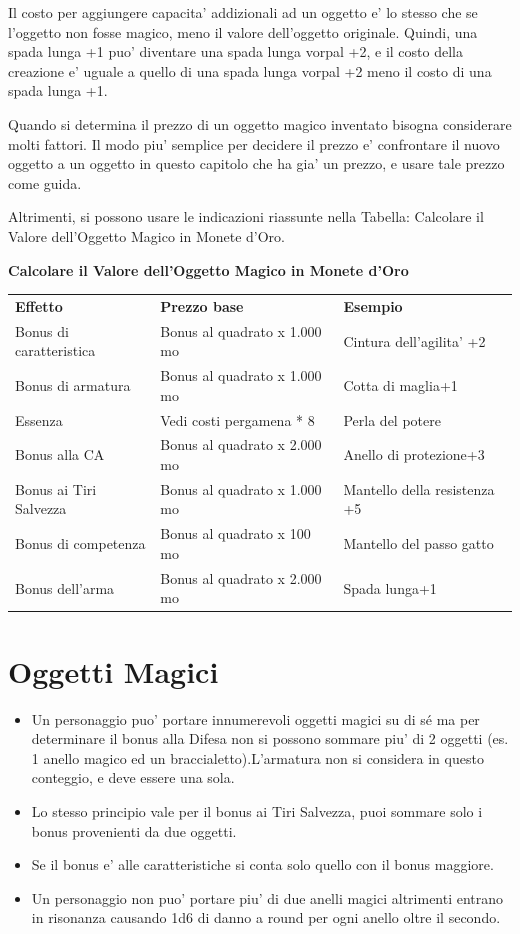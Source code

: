 \documentclass[a4paper,11pt,twoside,openany]{book}
\begin{document}
{		Il costo per aggiungere capacita' addizionali ad un oggetto e' lo stesso che se l'oggetto non fosse magico, meno il valore dell'oggetto originale. Quindi, una spada lunga +1 puo' diventare una spada lunga vorpal +2, e il costo della creazione e' uguale a quello di una spada lunga vorpal +2 meno il costo di una spada lunga +1.
		
		Quando si determina il prezzo di un oggetto magico inventato bisogna considerare molti fattori. Il modo piu' semplice per decidere il prezzo e' confrontare il nuovo oggetto a un oggetto in questo capitolo che ha gia' un prezzo, e usare tale prezzo come guida.
		
		Altrimenti, si possono usare le indicazioni riassunte nella Tabella: Calcolare il Valore dell'Oggetto Magico in Monete d'Oro.
		
		\bigskip
		
		\textbf{Calcolare il Valore dell'Oggetto Magico in Monete d'Oro}
		
		\begin{tabular}{lll}
			\toprule
			\textbf{Effetto} & \textbf{Prezzo base} & \textbf{Esempio}\tabularnewline
			Bonus di caratteristica & Bonus al quadrato x 1.000 mo & Cintura dell'agilita' +2\tabularnewline
			Bonus di armatura & Bonus al quadrato x 1.000 mo & Cotta di maglia+1\tabularnewline
			Essenza & Vedi costi pergamena {*} 8 & Perla del potere\tabularnewline
			Bonus alla CA & Bonus al quadrato x 2.000 mo & Anello di protezione+3\tabularnewline
			Bonus ai Tiri Salvezza & Bonus al quadrato x 1.000 mo & Mantello della resistenza +5\tabularnewline
			Bonus di competenza & Bonus al quadrato x 100 mo & Mantello del passo gatto\tabularnewline
			Bonus dell'arma & Bonus al quadrato x 2.000 mo & Spada lunga+1\tabularnewline
		\end{tabular}
		
		\pagebreak
		
		\section{Oggetti Magici}
		
		\label{oggetti-magici}
		\begin{itemize}
			\item 
			Un personaggio puo' portare innumerevoli oggetti magici su di sé ma per determinare il bonus alla Difesa non si possono sommare piu' di 2 oggetti (es. 1 anello magico ed un braccialetto).L'armatura non si considera in questo conteggio, e deve essere una sola.
			\item 
			Lo stesso principio vale per il bonus ai Tiri Salvezza, puoi sommare solo i bonus provenienti da due oggetti.
			\item 
			Se il bonus e' alle caratteristiche si conta solo quello con il bonus maggiore.
			\item 
			Un personaggio non puo' portare piu' di due anelli magici altrimenti
			entrano in risonanza causando 1d6 di danno a round per ogni anello oltre il secondo.
		\end{itemize}
		
}
\end{document}
